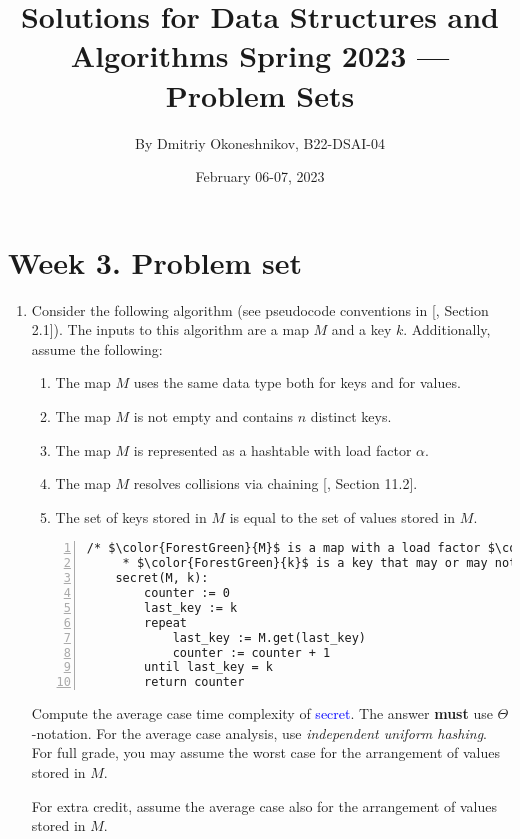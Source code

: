 \documentclass{article}
\title{Solutions for Data Structures and Algorithms Spring 2023 — Problem Sets}
\author{By Dmitriy Okoneshnikov, B22-DSAI-04}
\date{February 06-07, 2023}
\begin{document}
\maketitle

\section*{Week 3. Problem set}

\begin{enumerate}
    \item Consider the following algorithm (see pseudocode conventions in [, Section 2.1]). The inputs to this algorithm are a map $M$ and a key $k$. Additionally, assume the following:

    \begin{enumerate}
        \item The map $M$ uses the same data type both for keys and for values.
        \item The map $M$ is not empty and contains $n$ distinct keys.
        \item The map $M$ is represented as a hashtable with load factor $\alpha$.
        \item The map $M$ resolves collisions via chaining [, Section 11.2].
        \item The set of keys stored in $M$ is equal to the set of values stored in $M$.
    \end{enumerate}

    \begin{lstlisting}[numbers=left,language={},style=pseudo,mathescape=true,firstnumber=1]
    /* $\color{ForestGreen}{M}$ is a map with a load factor $\color{ForestGreen}{\alpha}$ and size $\color{ForestGreen}{n}$,
     * $\color{ForestGreen}{k}$ is a key that may or may not be in $\color{ForestGreen}{M}$ */
    secret(M, k):
        counter := 0
        last_key := k
        repeat
            last_key := M.get(last_key)
            counter := counter + 1
        until last_key = k
        return counter
    \end{lstlisting}

    Compute the average case time complexity of \textcolor{blue}{secret}. The answer \textbf{must} use $\Theta$-notation. For the average case analysis, use \textit{independent uniform hashing}. For full grade, you may assume the worst case for the arrangement of values stored in $M$.

    For extra credit, assume the average case also for the arrangement of values stored in $M$.


\end{enumerate}
\end{document}
